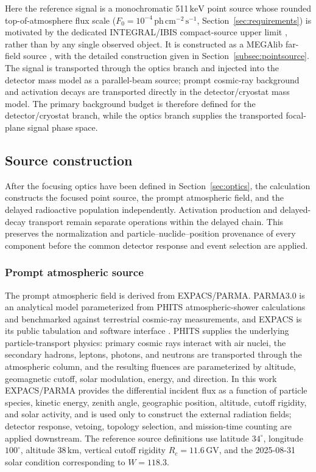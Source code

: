 \documentclass[11pt]{article}
\newcommand{\keV}{\ensuremath{\,\mathrm{keV}}}
\newcommand{\phcms}{\ensuremath{\,\mathrm{ph\,cm^{-2}\,s^{-1}}}}
\newcommand{\fzero}{F_{0}}
\begin{document}
Here the reference signal is a monochromatic 511\keV{} point source whose
rounded top-of-atmosphere flux scale
($\fzero=10^{-4}\phcms$, Section~\ref{sec:requirements}) is motivated by the
dedicated INTEGRAL/IBIS compact-source upper limit \cite{DeCesare2011}, rather
than by any single observed object. It is constructed as a MEGAlib far-field source
\cite{Zoglauer2006}, with the detailed construction given in
Section~\ref{subsec:pointsource}. The signal is transported through the optics
branch and injected into the detector mass model as a parallel-beam source;
prompt cosmic-ray background and activation decays are transported directly in
the detector/cryostat mass model. The primary background budget is therefore
defined for the detector/cryostat branch, while the optics branch supplies the
transported focal-plane signal phase space.

\subsection{Source construction}
\label{sec:background}

After the focusing optics have been defined in Section~\ref{sec:optics},
the calculation constructs the focused point source, the prompt atmospheric
field, and the delayed radioactive population independently. Activation
production and delayed-decay transport remain separate operations within the
delayed chain. This preserves the normalization and particle--nuclide--position
provenance of every component before the common detector response and event
selection are applied.

\subsubsection{Prompt atmospheric source}
\label{subsec:prompt_source}

The prompt atmospheric field is derived from EXPACS/PARMA. PARMA3.0 is an
analytical model parameterized from PHITS atmospheric-shower calculations and
benchmarked against terrestrial cosmic-ray measurements, and EXPACS is its
public tabulation and software interface
\cite{Sato2015EXPACS,Sato2016PARMA4}. PHITS supplies the underlying
particle-transport physics: primary cosmic rays interact with air nuclei, the
secondary hadrons, leptons, photons, and neutrons are transported through the
atmospheric column, and the resulting fluences are parameterized by altitude,
geomagnetic cutoff, solar modulation, energy, and direction. In this work
EXPACS/PARMA provides the differential incident flux as a function of particle
species, kinetic energy, zenith angle, geographic position, altitude, cutoff
rigidity, and solar activity, and is used only to construct the external
radiation fields; detector response, vetoing, topology selection, and
mission-time counting are applied downstream. The reference source definitions
use latitude $34^\circ$, longitude $100^\circ$, altitude $38\,\mathrm{km}$,
vertical cutoff rigidity $R_c=11.6\,\mathrm{GV}$, and the 2025-08-31 solar
condition corresponding to $W=118.3$.
\end{document}
